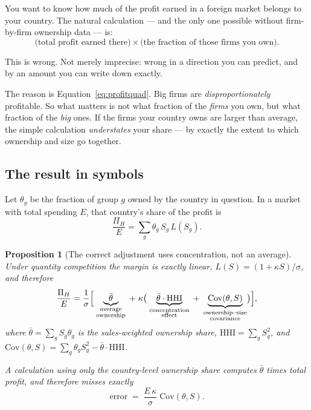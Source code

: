 \documentclass[11pt]{article}
\theoremstyle{plain}
\newtheorem{proposition}{Proposition}
\theoremstyle{remark}
\theoremstyle{definition}
\begin{document}
You want to know how much of the profit earned in a foreign market belongs to your
country. The natural calculation --- and the only one possible without firm-by-firm
ownership data --- is:
\[
  \text{(total profit earned there)}\times\text{(the fraction of those firms you own)}.
\]

This is wrong. Not merely imprecise: wrong in a direction you can predict, and by an
amount you can write down exactly.

The reason is Equation~\eqref{eq:profitquad}. Big firms are \emph{disproportionately}
profitable. So what matters is not what fraction of the \emph{firms} you own, but what
fraction of the \emph{big} ones. If the firms your country owns are larger than
average, the simple calculation \emph{understates} your share --- by exactly the
extent to which ownership and size go together.

\subsection{The result in symbols}

Let $\theta_g$ be the fraction of group $g$ owned by the country in question. In a
market with total spending $E$, that country's share of the profit is
\begin{equation}
  \frac{\Pi_H}{E}=\sum_g\theta_g\,S_g\,L(S_g).
  \label{eq:piH}
\end{equation}

\begin{proposition}[The correct adjustment uses concentration, not an average]
\label{prop:main}
Under quantity competition the margin is exactly linear, $L(S)=(1+\kappa S)/\sigma$,
and therefore
\begin{equation}
  \frac{\Pi_H}{E}
  =\frac{1}{\sigma}\Bigl[\;\underbrace{\bar\theta}_{\substack{\text{average}\\\text{ownership}}}
  \;+\;\kappa\bigl(\;\underbrace{\bar\theta\cdot \mathrm{HHI}}_{\substack{\text{concentration}\\\text{effect}}}
  \;+\;\underbrace{\mathrm{Cov}(\theta,S)}_{\substack{\text{ownership--size}\\\text{covariance}}}\bigr)\Bigr],
  \label{eq:decomp}
\end{equation}
where $\bar\theta=\sum_g S_g\theta_g$ is the sales-weighted ownership share,
$\mathrm{HHI}=\sum_g S_g^2$, and
$\mathrm{Cov}(\theta,S)=\sum_g\theta_gS_g^2-\bar\theta\cdot\mathrm{HHI}$.

A calculation using only the country-level ownership share computes $\bar\theta$ times
total profit, and therefore misses \emph{exactly}
\begin{equation}
  \boxed{\;\text{error}\;=\;\frac{E\,\kappa}{\sigma}\;\mathrm{Cov}(\theta,S).\;}
  \label{eq:error}
\end{equation}
\end{proposition}
\end{document}
